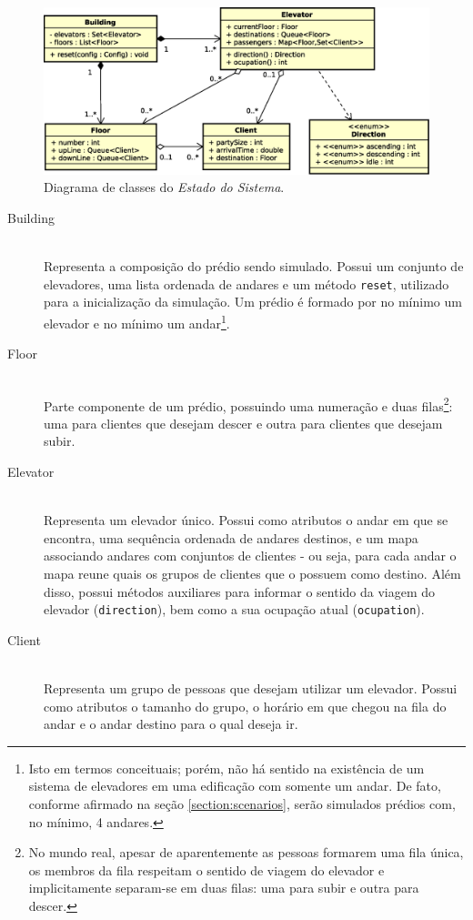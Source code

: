 \begin{figure}[htb!]
  \centering
  \includegraphics[scale=0.6]{img/Model.eps}
  \caption{Diagrama de classes do \textit{Estado do Sistema}.}
\label{fig:diagram:system}
\end{figure}

\begin{description}
  \item[Building] \hfill \\
    Representa a composição do prédio sendo simulado. Possui um conjunto de
    elevadores, uma lista ordenada de andares e um método \texttt{reset},
    utilizado para a inicialização da simulação. Um prédio é formado por no
    mínimo um elevador e no mínimo um andar\footnote{Isto em termos conceituais;
    porém, não há sentido na existência de um sistema de elevadores em uma
    edificação com somente um andar. De fato, conforme afirmado na seção
    \ref{section:scenarios}, serão simulados prédios com, no mínimo, 4
    andares.}.

  \item[Floor] \hfill \\
    Parte componente de um prédio, possuindo uma numeração e duas
    filas\footnote{No mundo real, apesar de aparentemente as pessoas formarem
    uma fila única, os membros da fila respeitam o sentido de viagem do elevador
    e implicitamente separam-se em duas filas: uma para subir e outra para
    descer.}: uma para clientes que desejam descer e outra para clientes que
    desejam subir.

\item[Elevator] \hfill \\
    Representa um elevador único. Possui como atributos o andar em que se
    encontra, uma sequência ordenada de andares destinos, e um mapa associando
    andares com conjuntos de clientes - ou seja, para cada andar o mapa reune
    quais os grupos de clientes que o possuem como destino. Além disso, possui
    métodos auxiliares para informar o sentido da viagem do elevador
    (\texttt{direction}), bem como a sua ocupação atual (\texttt{ocupation}).

\item[Client] \hfill \\
    Representa um grupo de pessoas que desejam utilizar um elevador. Possui como
    atributos o tamanho do grupo, o horário em que chegou na fila do andar e o
    andar destino para o qual deseja ir.

\end{description}

